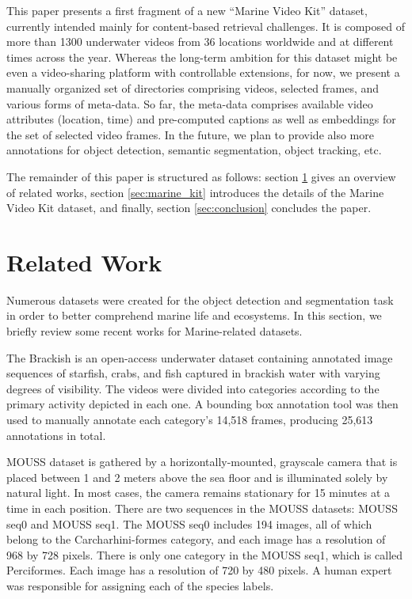 \documentclass[runningheads]{llncs}
\begin{document}
This paper presents a first fragment of a new ``Marine Video Kit'' dataset, currently intended mainly for content-based retrieval challenges. It is composed of more than 1300 underwater videos from 36 locations worldwide and at different times across the year. Whereas the long-term ambition for this dataset might be even a video-sharing platform with controllable extensions, for now, we present a manually organized set of directories comprising videos, selected frames, and various forms of meta-data. So far, the meta-data comprises available video attributes (location, time) and pre-computed captions as well as embeddings for the set of selected video frames. In the future, we plan to provide also more annotations for object detection, semantic segmentation, object tracking, etc.

The remainder of this paper is structured as follows:  section \ref{sec:related_works} gives an overview of related works, section \ref{sec:marine_kit} introduces the details of the Marine Video Kit dataset, and finally, section \ref{sec:conclusion} concludes the paper.




\section{Related Work}
\label{sec:related_works}

Numerous datasets were created for the object detection and segmentation task in order to better comprehend marine life and ecosystems. In this section, we briefly review some recent works for Marine-related datasets.

The Brackish \cite{pedersen2019brackish} is an open-access underwater dataset containing annotated image sequences of starfish, crabs, and fish captured in brackish water with varying degrees of visibility. The videos were divided into categories according to the primary activity depicted in each one. A bounding box annotation tool was then used to manually annotate each category's 14,518 frames, producing 25,613 annotations in total. 

MOUSS dataset \cite{mouss2018dataset} is gathered by a horizontally-mounted, grayscale camera that is placed between 1 and 2 meters above the sea floor and is illuminated solely by natural light. In most cases, the camera remains stationary for 15 minutes at a time in each position. There are two sequences in the MOUSS datasets: MOUSS seq0 and MOUSS seq1. The MOUSS seq0 includes 194 images, all of which belong to the Carcharhini-formes category, and each image has a resolution of 968 by 728 pixels. There is only one category in the MOUSS seq1, which is called Perciformes. Each image has a resolution of 720 by 480 pixels. A human expert was responsible for assigning each of the species labels. 
\end{document}
